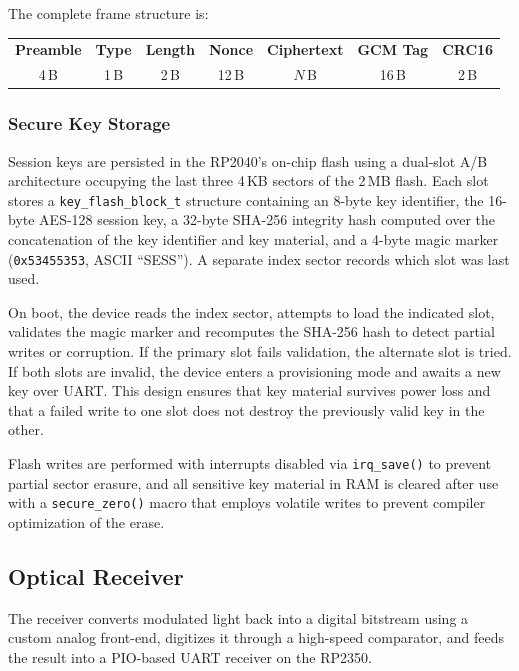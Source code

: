 \documentclass[conference]{IEEEtran}
\begin{document}
The complete frame structure is:

\begin{center}
\small
\begin{tabular}{|c|c|c|c|c|c|c|}
\hline
\textbf{Preamble} & \textbf{Type} & \textbf{Length} & \textbf{Nonce} & \textbf{Ciphertext} & \textbf{GCM Tag} & \textbf{CRC16} \\
4\,B & 1\,B & 2\,B & 12\,B & $N$\,B & 16\,B & 2\,B \\
\hline
\end{tabular}
\end{center}

\subsubsection{Secure Key Storage}

Session keys are persisted in the RP2040's on-chip flash using a dual-slot A/B architecture occupying the last three 4\,KB sectors of the 2\,MB flash. Each slot stores a \texttt{key\_flash\_block\_t} structure containing an 8-byte key identifier, the 16-byte AES-128 session key, a 32-byte SHA-256 integrity hash computed over the concatenation of the key identifier and key material, and a 4-byte magic marker (\texttt{0x53455353}, ASCII ``SESS''). A separate index sector records which slot was last used.

On boot, the device reads the index sector, attempts to load the indicated slot, validates the magic marker and recomputes the SHA-256 hash to detect partial writes or corruption. If the primary slot fails validation, the alternate slot is tried. If both slots are invalid, the device enters a provisioning mode and awaits a new key over UART. This design ensures that key material survives power loss and that a failed write to one slot does not destroy the previously valid key in the other.

Flash writes are performed with interrupts disabled via \texttt{irq\_save()} to prevent partial sector erasure, and all sensitive key material in RAM is cleared after use with a \texttt{secure\_zero()} macro that employs volatile writes to prevent compiler optimization of the erase.

\subsection{Optical Receiver}

The receiver converts modulated light back into a digital bitstream using a custom analog front-end, digitizes it through a high-speed comparator, and feeds the result into a PIO-based UART receiver on the RP2350.
\end{document}
